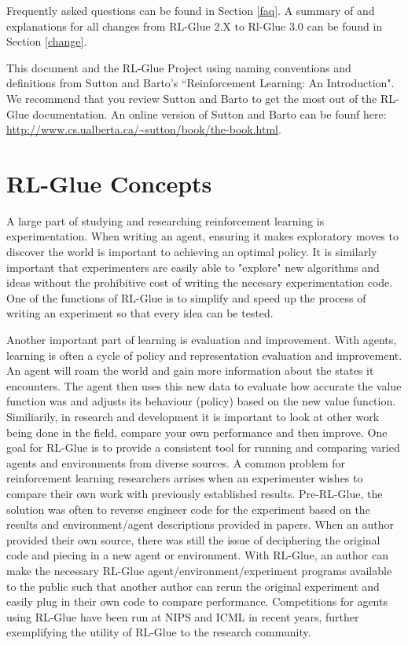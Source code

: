 \documentclass[11pt]{article}
\begin{document}
Frequently asked questions can be found in Section \ref{faq}. A summary of and explanations for all changes from RL-Glue 2.X to Rl-Glue 3.0 can be found in Section \ref{change}.

This document and the RL-Glue Project using naming conventions and definitions from Sutton and Barto's ``Reinforcement Learning: An Introduction". We recommend that you review Sutton and Barto to get the most out of the RL-Glue documentation. An online version of Sutton and Barto can be founf here: \url{http://www.cs.ualberta.ca/~sutton/book/the-book.html}.



 
 
\section{RL-Glue Concepts}
\label{RL-Glue}
A large part of studying and researching reinforcement learning is experimentation. When writing an agent, ensuring it makes exploratory moves to discover the world is important to achieving an optimal policy. It is similarly important that experimenters are easily able to "explore" new algorithms and ideas without the prohibitive cost of writing the necesary experimentation code. One of the functions of RL-Glue is to simplify and speed up the process of writing an experiment so that every idea can be tested. 


Another important part of learning is evaluation and improvement. With agents, learning is often a cycle of policy and representation evaluation and improvement.  An agent will roam the world and gain more information about the states it encounters. The agent then uses this new data to evaluate how accurate the value function was and adjusts its behaviour (policy) based on the new value function. Similiarily, in research and development it is important to look at other work being done in the field, compare your own performance and then improve. One goal for RL-Glue is to provide a consistent tool for running and comparing varied agents and environments from diverse sources. A common problem for reinforcement learning researchers arrises when an experimenter wishes to compare their own work with previously established results. Pre-RL-Glue, the solution was often to reverse engineer code for the experiment based on the results and environment/agent descriptions provided in papers.  When an author provided their own source, there was still the issue of deciphering the original code and piecing in a new agent or environment. With RL-Glue, an author can make the necessary RL-Glue agent/environment/experiment programs  available to the public such that another author can rerun the original experiment and easily plug in their own code to compare performance.  Competitions for agents using RL-Glue have been run at NIPS and ICML in recent years, further exemplifying the utility of RL-Glue to the research community.
 
\end{document}
